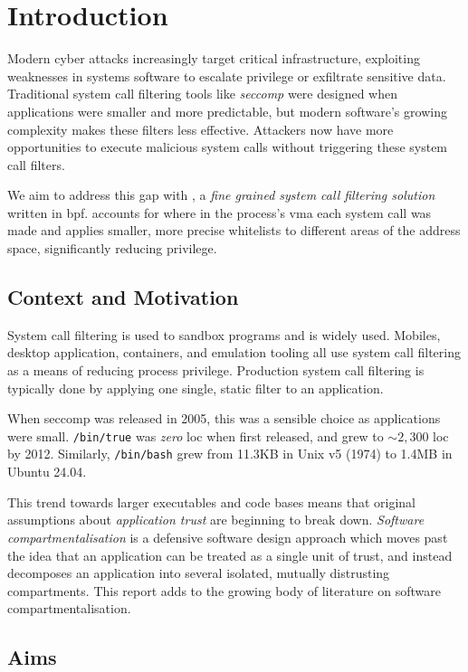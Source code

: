 \section{Introduction}

Modern cyber attacks increasingly target critical infrastructure, exploiting
weaknesses in systems software to escalate privilege or exfiltrate sensitive
data. Traditional system call filtering tools like \textit{seccomp} were designed when
applications were smaller and more predictable, but modern software's growing
complexity makes these filters less effective. Attackers now have more
opportunities to execute malicious system calls without triggering these system
call filters. 

We aim to address this gap with \af, a \textit{fine grained system call
filtering solution} written in \ac{bpf}. \af accounts for where in the process's \ac{vma} each
system call was made and applies smaller, more precise whitelists to
different areas of the address space, significantly reducing privilege.

\subsection{Context and Motivation}

System call filtering is used to sandbox programs and is widely used. Mobiles,
desktop application, containers, and emulation tooling all use system call
filtering as a means of reducing process privilege. Production system call
filtering is typically done by applying one single, static filter to an
application. 

When seccomp was released in 2005, this was a sensible choice as
applications were small. \texttt{/bin/true} was \textit{zero} \ac{loc} when
first released, and grew to $\sim2,300$ \ac{loc} by 2012. Similarly,
\texttt{/bin/bash} grew from 11.3KB in Unix v5 (1974) to 1.4MB in Ubuntu 24.04.

This trend towards larger executables and code bases means that original
assumptions about \textit{application trust} are beginning to break down.
\textit{Software compartmentalisation} is a defensive software design approach
which moves past the idea that an application can be treated as a single unit of
trust, and instead decomposes an application into several isolated, mutually
distrusting compartments. This report adds to the growing body of literature on
software compartmentalisation.

\subsection{Aims}

